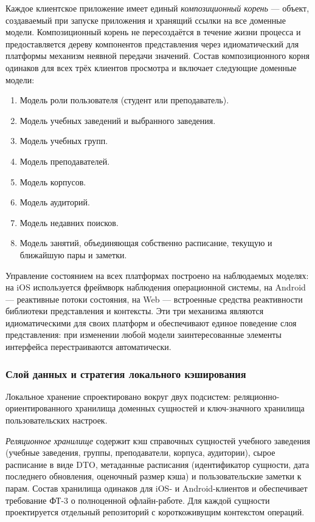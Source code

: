 Каждое клиентское приложение имеет единый \emph{композиционный корень} --- объект, создаваемый при запуске приложения и хранящий ссылки на все доменные модели. Композиционный корень не пересоздаётся в течение жизни процесса и предоставляется дереву компонентов представления через идиоматический для платформы механизм неявной передачи значений. Состав композиционного корня одинаков для всех трёх клиентов просмотра и включает следующие доменные модели:

\begin{enumerate}
  \item Модель роли пользователя (студент или преподаватель).
  \item Модель учебных заведений и выбранного заведения.
  \item Модель учебных групп.
  \item Модель преподавателей.
  \item Модель корпусов.
  \item Модель аудиторий.
  \item Модель недавних поисков.
  \item Модель занятий, объединяющая собственно расписание, текущую и ближайшую пары и заметки.
\end{enumerate}

Управление состоянием на всех платформах построено на наблюдаемых моделях: на iOS используется фреймворк наблюдения операционной системы, на Android --- реактивные потоки состояния, на Web --- встроенные средства реактивности библиотеки представления и контексты. Эти три механизма являются идиоматическими для своих платформ и обеспечивают единое поведение слоя представления: при изменении любой модели заинтересованные элементы интерфейса перестраиваются автоматически.

\subsubsection{Слой данных и стратегия локального кэширования}
\label{subsubsec:data-layer}

Локальное хранение спроектировано вокруг двух подсистем: реляционно-ориентированного хранилища доменных сущностей и ключ-значного хранилища пользовательских настроек.

\emph{Реляционное хранилище} содержит кэш справочных сущностей учебного заведения (учебные заведения, группы, преподаватели, корпуса, аудитории), сырое расписание в виде DTO, метаданные расписания (идентификатор сущности, дата последнего обновления, оценочный размер кэша) и пользовательские заметки к парам. Состав хранилища одинаков для iOS- и Android-клиентов и обеспечивает требование ФТ-3 о полноценной офлайн-работе. Для каждой сущности проектируется отдельный репозиторий с короткоживущим контекстом операций.

